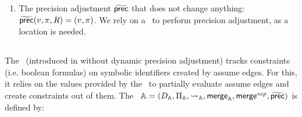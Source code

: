 \begin{enumerate}[leftmargin=*, label=\arabic*.]
\item
The precision adjustment $\operatorname{\widetilde{\operatorname{\operatorname{\mathsf{prec}}}}}$ that does not change anything: $\operatorname{\widetilde{\operatorname{\operatorname{\mathsf{prec}}}}}(v, \pi, R) = (v, \pi)$. We rely on a \compositeCPA\ to perform precision adjustment, as a location is needed.

\end{enumerate}

\subsection{\ConstraintsCPA} \label{sec:constraintsCPA}
The \constraintsCPA\ (introduced in \cite{Lemberger2015} without dynamic precision adjustment) tracks constraints (i.e. boolean formulas) on symbolic identifiers created by assume edges.
For this, it relies on the values provided by the \symbolicValueAnalysisCPA\ to partially evaluate assume edges and create constraints out of them.
The \constraintsCPA\ $\mathbb{A} = (D_{\mathbb{A}}, \Pi_{\mathbb{A}}, \rightsquigarrow_{\mathbb{A}}, \operatorname{\operatorname{\mathsf{merge}}}_{\mathbb{A}}, \operatorname{\operatorname{\mathsf{merge}}}^{sep}, \operatorname{\widetilde{\operatorname{\operatorname{\mathsf{prec}}}}})$ is defined by:
